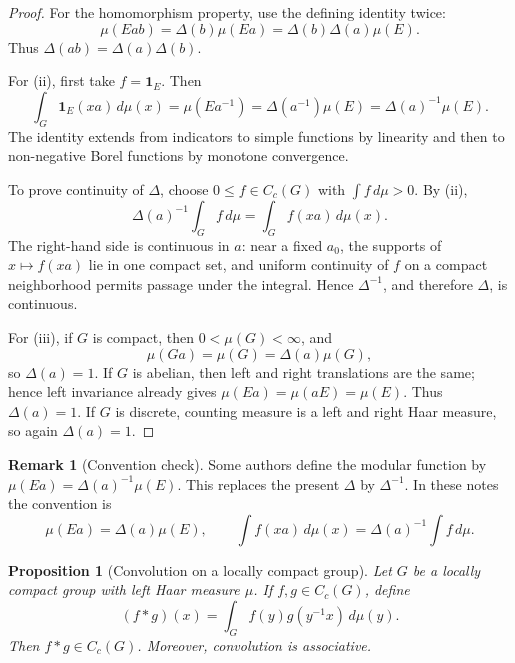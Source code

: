 \documentclass[11pt,openany]{book}
\numberwithin{equation}{chapter}
\theoremstyle{definition}
\newtheorem{remark}[definition]{Remark}
\theoremstyle{plain}
\newtheorem{proposition}[definition]{Proposition}
\theoremstyle{remark}
\newcommand{\1}{\mathbf{1}}
\newcommand{\dd}{\,d}
\begin{document}
\begin{proof}
For the homomorphism property, use the defining identity twice:
\[
  \mu(Eab)=\Delta(b)\mu(Ea)=\Delta(b)\Delta(a)\mu(E).
\]
Thus \(\Delta(ab)=\Delta(a)\Delta(b)\).

For (ii), first take \(f=\1_E\). Then
\[
  \int_G\1_E(xa)\dd\mu(x)
  =\mu(Ea^{-1})
  =\Delta(a^{-1})\mu(E)
  =\Delta(a)^{-1}\mu(E).
\]
The identity extends from indicators to simple functions by linearity and then to non-negative Borel functions by monotone convergence.

To prove continuity of \(\Delta\), choose \(0\leq f\in C_c(G)\) with \(\int f\dd\mu>0\). By (ii),
\[
  \Delta(a)^{-1}\int_G f\dd\mu=\int_G f(xa)\dd\mu(x).
\]
The right-hand side is continuous in \(a\): near a fixed \(a_0\), the supports of \(x\mapsto f(xa)\) lie in one compact set, and uniform continuity of \(f\) on a compact neighborhood permits passage under the integral. Hence \(\Delta^{-1}\), and therefore \(\Delta\), is continuous.

For (iii), if \(G\) is compact, then \(0<\mu(G)<\infty\), and
\[
  \mu(Ga)=\mu(G)=\Delta(a)
\mu(G),
\]
so \(\Delta(a)=1\). If \(G\) is abelian, then left and right translations are the same; hence left invariance already gives \(\mu(Ea)=\mu(aE)=\mu(E)\). Thus \(\Delta(a)=1\). If \(G\) is discrete, counting measure is a left and right Haar measure, so again \(\Delta(a)=1\).
\end{proof}

\begin{remark}[Convention check]
Some authors define the modular function by \(\mu(Ea)=\Delta(a)^{-1}\mu(E)\). This replaces the present \(\Delta\) by \(\Delta^{-1}\). In these notes the convention is
\[
  \mu(Ea)=\Delta(a)\mu(E),
  \qquad
  \int f(xa)\dd\mu(x)=\Delta(a)^{-1}\int f\dd\mu.
\]
\end{remark}

\begin{proposition}[Convolution on a locally compact group]
Let \(G\) be a locally compact group with left Haar measure \(\mu\). If \(f,g\in C_c(G)\), define
\[
  (f*g)(x)=\int_G f(y)g(y^{-1}x)\dd\mu(y).
\]
Then \(f*g\in C_c(G)\). Moreover, convolution is associative.
\end{proposition}
\end{document}
